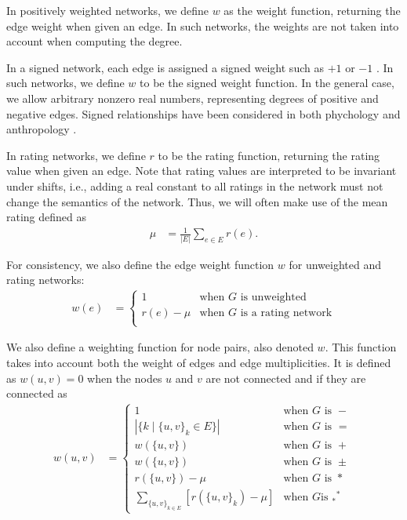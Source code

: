 \documentclass{article}
\begin{document}
In positively weighted networks, we define $w$ as the
weight function, returning the edge weight when given an edge. In such
networks, the weights are not taken into account when computing the
degree. 

In a signed network, each edge is assigned a signed weight such as $+1$
or $-1$ \citep{b647}.  In such networks, we define $w$ to be the signed weight
function.  In the general case, we allow arbitrary nonzero real numbers,
representing degrees of positive and negative edges.  Signed
relationships have been considered in both phychology \citep{b862} and
anthropology \citep{b323}.  

In rating networks, we define $r$ to be
the rating function, returning the rating value when given an edge.  Note
that rating values are interpreted to be invariant under shifts, i.e.,
adding a real constant to all ratings in the network must not
change the semantics of the network.  Thus, we will often make use of
the mean rating defined as
\begin{align}
  \mu &= \frac 1 {|E|} \sum_{e\in E} r(e). 
\end{align}

For consistency, we also
define the edge weight function $w$ for unweighted and rating networks: 
\begin{align}
  w(e) &= \left\{ \begin{array}{ll} 
    1 & \text{when $G$ is unweighted} \\
    r(e)-\mu & \text{when $G$ is a rating network} \\
    \end{array} \right. 
\end{align}

We also define a weighting function for node pairs, also denoted
$w$. This function takes into account both the weight of edges and edge
multiplicities. It is defined as $w(u,v)=0$ when the nodes $u$ and $v$ are
not connected and if they are connected as
\begin{align}
  w(u,v) &= \left\{ \begin{array}{ll}
    1 & \text{when $G$ is $-$} \\
    |\{k \mid \{u,v\}_k \in E\}| & \text{when $G$ is $=$} \\
    w(\{u,v\}) & \text{when $G$ is $+$}
    \\
    w(\{u,v\}) & \text{when $G$ is $\pm$} \\
    r(\{u,v\}) - \mu & \text{when $G$ is $*$} \\
    \sum_{\{u,v\}_{k\in E}} [r(\{u,v\}_k) - \mu] & \text{when $G$
      is $_*{}^*$}
    \end{array} \right. 
\end{align}
\end{document}
